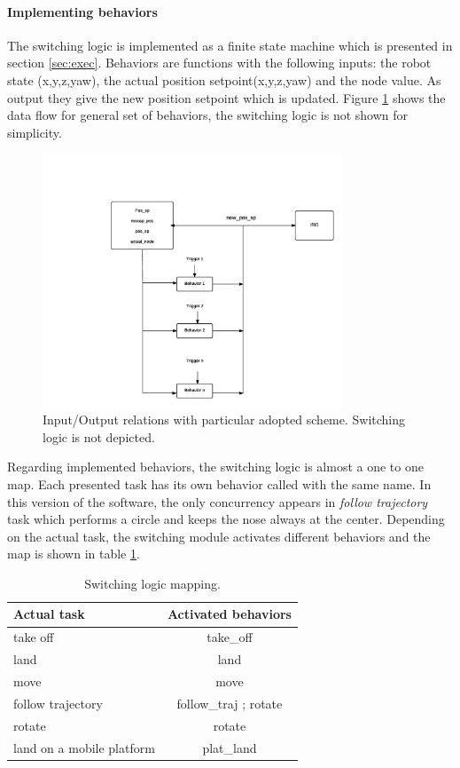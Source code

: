 \paragraph{Implementing behaviors} The switching logic is implemented as a finite state machine which is presented in section \ref{sec:exec}. Behaviors are functions with the following inputs: the robot state (x,y,z,yaw), the actual position setpoint(x,y,z,yaw) and the node value. As output they give the new position setpoint which is updated. Figure \ref{figure:flow} shows the data flow for general set of behaviors, the switching logic is not shown for simplicity. 
\begin{figure}[h]
\centering
 \includegraphics[width=0.8\textwidth]{behav_flow.png}
 \caption[Behavior data flow]{Input/Output relations with particular adopted scheme. Switching logic is not depicted.}
 \label{figure:flow}
\end{figure}
Regarding implemented behaviors, the switching logic is almost a one to one map. Each presented task has its own behavior called with the same name. In this version of the software, the only concurrency appears in \textit{follow trajectory} task which performs a circle and keeps the nose always at the center. Depending on the actual task, the switching module activates different behaviors and the map is shown in table \ref{tab:map}.
\begin{table}[h]
\centering
\begin{tabular}{l|c}
Actual task               & Activated behaviors   \\ \hline
take off                  & take\_off             \\
land                      & land                  \\
move                      & move                  \\
follow trajectory         & follow\_traj ; rotate \\
rotate                    & rotate                \\
land on a mobile platform & plat\_land           
\end{tabular}
\caption{Switching logic mapping.}
\label{tab:map}
\end{table}

